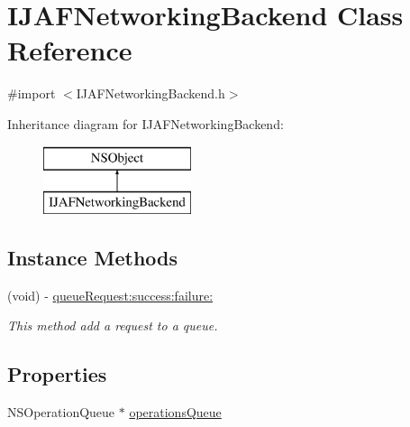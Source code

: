 \hypertarget{interface_i_j_a_f_networking_backend}{\section{I\+J\+A\+F\+Networking\+Backend Class Reference}
\label{interface_i_j_a_f_networking_backend}
}


{\ttfamily \#import $<$I\+J\+A\+F\+Networking\+Backend.\+h$>$}

Inheritance diagram for I\+J\+A\+F\+Networking\+Backend\+:\begin{figure}[H]
\begin{center}
\leavevmode
\includegraphics[height=2.000000cm]{interface_i_j_a_f_networking_backend}
\end{center}
\end{figure}
\subsection*{Instance Methods}
\begin{DoxyCompactItemize}
\item 
(void) -\/ \hyperlink{interface_i_j_a_f_networking_backend_a625df20d6ea6e780aafb7b438f66efad}{queue\+Request\+:success\+:failure\+:}
\begin{DoxyCompactList}\small\item\em This method add a request to a queue. \end{DoxyCompactList}\end{DoxyCompactItemize}
\subsection*{Properties}
\begin{DoxyCompactItemize}
\item 
N\+S\+Operation\+Queue $\ast$ \hyperlink{interface_i_j_a_f_networking_backend_ac2f0b3315f3a4761b445c5a822dd84c4}{operations\+Queue}
\end{DoxyCompactItemize}


